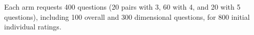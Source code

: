 Each arm requests 400 questions (20 pairs with 3, 60 with 4, and 20 with 5 questions), including 100 overall and 300 dimensional questions, for 800 initial individual ratings.